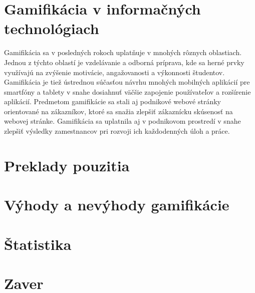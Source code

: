 \documentclass[14pt,twoside,a4paper]{article}
\begin{document}
\section{Gamifikácia v informačných technológiach}
Gamifikácia sa v posledných rokoch uplatňuje v mnohých rôznych oblastiach. 
Jednou z týchto oblastí je vzdelávanie a odborná príprava, 
kde sa herné prvky využívajú na zvýšenie motivácie, 
angažovanosti a výkonnosti študentov. 
Gamifikácia je tiež ústrednou súčasťou návrhu mnohých 
mobilných aplikácií pre smartfóny a tablety v snahe 
dosiahnuť väčšie zapojenie používateľov a rozšírenie aplikácií. 
Predmetom gamifikácie sa stali aj podnikové webové 
stránky orientované na zákazníkov, 
ktoré sa snažia zlepšiť zákaznícku skúsenosť na webovej 
stránke. Gamifikácia sa uplatnila aj v podnikovom 
prostredí v snahe zlepšiť výsledky zamestnancov pri 
rozvoji ich každodenných úloh a práce\cite{gamifsoft}.



\section{Preklady pouzitia}
\section{Výhody a nevýhody gamifikácie}

\section{Štatistika}

\section{Zaver}





\end{document}
